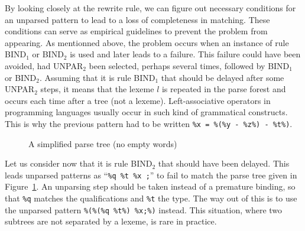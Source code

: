 By looking closely at the rewrite rule, we can figure out necessary
conditions for an unparsed pattern to lead to a loss of completeness
in matching. These conditions can serve as empirical guidelines to
prevent the problem from appearing. As mentionned above, the problem
occurs when an instance of rule \textsf{BIND}\(_1\) or
\textsf{BIND}\(_2\) is used and later leads to a failure. This failure
could have been avoided, had \textsf{UNPAR}\(_2\) been selected,
perhaps several times, followed by \textsf{BIND}\(_1\) or
\textsf{BIND}\(_2\). Assuming that it is rule \textsf{BIND}\(_1\) that
should be delayed after some \textsf{UNPAR}\(_2\) steps, it means that
the lexeme \(l\) is repeated in the parse forest and occurs each time
after a tree (not a lexeme). Left\hyp{}associative operators in
programming languages usually occur in such kind of grammatical
constructs. This is why the previous pattern had to be written
\texttt{\%x = \%(\%y - \%z\%) - \%t\%)}.

\begin{figure}[H]
%
\caption{A simplified parse tree (no empty words)\label{fig:const_static}}
\end{figure}

Let us consider now that it is rule \textsf{BIND}\(_2\) that should
have been delayed. This leads unparsed patterns as ``\texttt{\%q \%t
\%x ;}'' to fail to match the parse tree given in
Figure~\ref{fig:const_static}. An unparsing step should be taken
instead of a premature binding, so that \texttt{\%q} matches the
qualifications and \texttt{\%t} the type. The way out of this is to
use the unparsed pattern \texttt{\%(\%(\%q \%t\%) \%x;\%)}
instead. This situation, where two subtrees are not separated by a
lexeme, is rare in practice.
